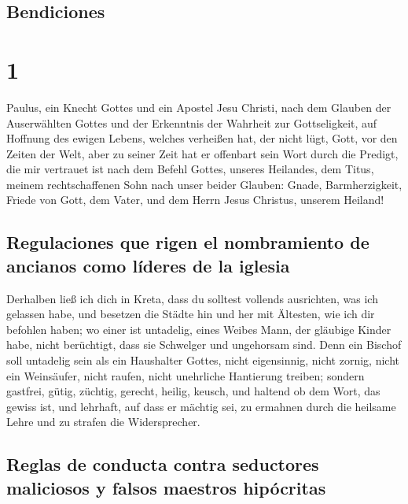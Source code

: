 \hypertarget{bendiciones}{%
\subsection{Bendiciones}\label{bendiciones}}

\hypertarget{section}{%
\section{1}\label{section}}

 Paulus, ein Knecht Gottes und ein Apostel Jesu Christi,
nach dem Glauben der Auserwählten Gottes und der Erkenntnis der Wahrheit
zur Gottseligkeit,  auf Hoffnung des ewigen Lebens,
welches verheißen hat, der nicht lügt, Gott, vor den Zeiten der Welt,
 aber zu seiner Zeit hat er offenbart sein Wort durch die
Predigt, die mir vertrauet ist nach dem Befehl Gottes, unseres
Heilandes,  dem Titus, meinem rechtschaffenen Sohn nach
unser beider Glauben: Gnade, Barmherzigkeit, Friede von Gott, dem Vater,
und dem Herrn Jesus Christus, unserem Heiland!

\hypertarget{regulaciones-que-rigen-el-nombramiento-de-ancianos-como-luxedderes-de-la-iglesia}{%
\subsection{Regulaciones que rigen el nombramiento de ancianos como
líderes de la
iglesia}\label{regulaciones-que-rigen-el-nombramiento-de-ancianos-como-luxedderes-de-la-iglesia}}

 Derhalben ließ ich dich in Kreta, dass du solltest
vollends ausrichten, was ich gelassen habe, und besetzen die Städte hin
und her mit Ältesten, wie ich dir befohlen haben;  wo
einer ist untadelig, eines Weibes Mann, der gläubige Kinder habe, nicht
berüchtigt, dass sie Schwelger und ungehorsam sind.  Denn
ein Bischof soll untadelig sein als ein Haushalter Gottes, nicht
eigensinnig, nicht zornig, nicht ein Weinsäufer, nicht raufen, nicht
unehrliche Hantierung treiben;  sondern gastfrei, gütig,
züchtig, gerecht, heilig, keusch,  und haltend ob dem
Wort, das gewiss ist, und lehrhaft, auf dass er mächtig sei, zu ermahnen
durch die heilsame Lehre und zu strafen die Widersprecher.

\hypertarget{reglas-de-conducta-contra-seductores-maliciosos-y-falsos-maestros-hipuxf3critas}{%
\subsection{Reglas de conducta contra seductores maliciosos y falsos
maestros
hipócritas}\label{reglas-de-conducta-contra-seductores-maliciosos-y-falsos-maestros-hipuxf3critas}}

